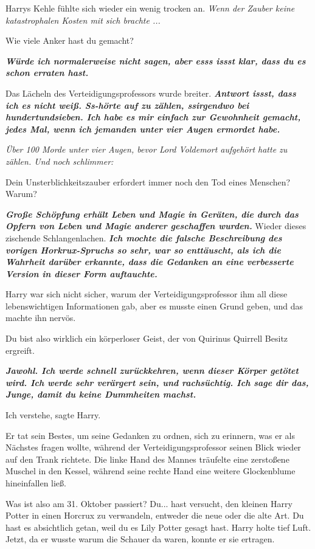 Harrys Kehle fühlte sich wieder ein wenig trocken an.
\emph{Wenn der Zauber keine katastrophalen Kosten mit sich brachte ...}

\glqq{}Wie viele Anker hast du gemacht?\grqq{}

\glqq{}\textbf{\emph{Würde ich normalerweise nicht sagen, aber esss issst klar,
dass du es schon erraten hast.}}\grqq{}

Das Lächeln des Verteidigungsprofessors wurde breiter. \glqq{}
\textbf{\emph{Antwort issst, dass ich es nicht weiß. Ss-hörte auf zu zählen,
ssirgendwo bei hundertundsieben. Ich habe es mir einfach zur Gewohnheit gemacht,
jedes Mal, wenn ich jemanden unter vier Augen ermordet habe.}}\grqq{}

\emph{Über 100 Morde unter vier Augen, bevor Lord Voldemort aufgehört hatte zu
zählen. Und noch schlimmer:}

\glqq{}Dein Unsterblichkeitszauber erfordert immer noch den Tod eines Menschen?
Warum?\grqq{}

\glqq{}\textbf{\emph{Große Schöpfung erhält Leben und Magie in Geräten, die durch
das Opfern von Leben und Magie anderer geschaffen wurden.}}\grqq{} Wieder dieses
zischende Schlangenlachen. \glqq{}\textbf{\emph{Ich mochte die falsche
Beschreibung des vorigen Horkrux-Spruchs so sehr, war so enttäuscht, als ich die
Wahrheit darüber erkannte, dass die Gedanken an eine verbesserte Version in
dieser Form auftauchte.}}\grqq{}

Harry war sich nicht sicher, warum der Verteidigungsprofessor ihm all diese
lebenswichtigen Informationen gab, aber es musste einen Grund geben, und das
machte ihn nervös.

\glqq{}Du bist also wirklich ein körperloser Geist, der von Quirinus Quirrell
Besitz ergreift.\grqq{}

\glqq{}\textbf{\emph{Jawohl. Ich werde schnell zurückkehren, wenn dieser Körper
getötet wird. Ich werde sehr verärgert sein, und rachsüchtig. Ich sage dir das,
Junge, damit du keine Dummheiten machst.}}\grqq{}

\glqq{}Ich verstehe\grqq{}, sagte Harry.

Er tat sein Bestes, um seine Gedanken zu ordnen, sich zu erinnern, was er als
Nächstes fragen wollte, während der Verteidigungsprofessor seinen Blick wieder
auf den Trank richtete. Die linke Hand des Mannes träufelte eine zerstoßene
Muschel in den Kessel, während seine rechte Hand eine weitere Glockenblume
hineinfallen ließ.

\glqq{}Was ist also am 31. Oktober passiert? Du... hast versucht, den kleinen
Harry Potter in einen Horcrux zu verwandeln, entweder die neue oder die alte
Art. Du hast es absichtlich getan, weil du es Lily Potter gesagt hast.\grqq{}
Harry holte tief Luft. Jetzt, da er wusste warum die Schauer da waren, konnte er
sie ertragen.

